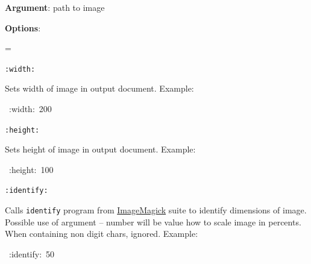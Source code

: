 \documentclass[12pt]{article}
\newenvironment{deflist}[1]{%
\begin{list}{}
{\renewcommand{\makelabel}[1]{\textbf{##1}\hfill}
\settowidth{\labelwidth}{\textbf{#1}}
\leftmargin=\labelwidth
\advance \leftmargin\labelsep}}
{\end{list}}
\begin{document}
\begin{itemize}
\item
\textbf{Argument}: path to image

\item
\textbf{Options}:

 \begin{deflist}{iii}

\item[ \texttt{:width:}]

Sets width of image in output document. Example:

\begin{ttfamily}\begin{flushleft}
\mbox{~:width:~200}\\
\end{flushleft}\end{ttfamily}

\item[ \texttt{:height:}]

Sets height of image in output document. Example:

\begin{ttfamily}\begin{flushleft}
\mbox{~:height:~100}\\
\end{flushleft}\end{ttfamily}

\item[ \texttt{:identify:}]

Calls \texttt{identify} program from \href{http://www.imagemagick.org}{ImageMagick} suite to identify
dimensions of image. Possible use of argument -- number will be value
how to scale image in percents. When containing non digit chars,
ignored. Example:

\begin{ttfamily}\begin{flushleft}
\mbox{~:identify:~50}\\
\end{flushleft}\end{ttfamily}

 \begin{center}
\end{center}


\end{deflist}
\end{itemize}
\end{document}
